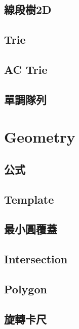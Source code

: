     \subsection{線段樹2D}
        
    \subsection{Trie}
        
    \subsection{AC Trie}
        
    \subsection{單調隊列}
        
    \columnbreak
        
\section{Geometry}
    \subsection{公式}
        
    \subsection{Template}
        
    \subsection{最小圓覆蓋}
        
    \columnbreak
    \subsection{Intersection}
        
    \subsection{Polygon}
        
    \columnbreak
    \subsection{旋轉卡尺}
        
